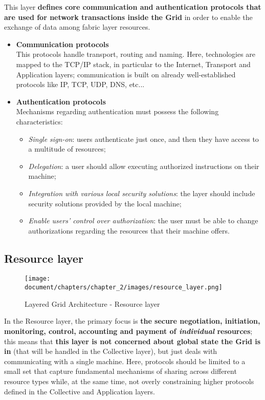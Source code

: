 \noindent This layer \textbf{defines core communication and authentication protocols that are used for network transactions inside the Grid} in order to enable the exchange of data among fabric layer resources.
\begin{itemize}
    \item \textbf{Communication protocols}\\
    This protocols handle transport, routing and naming. Here, technologies are mapped to the TCP/IP stack, in particular to the Internet, Transport and Application layers; communication is built on already well-established protocols like IP, TCP, UDP, DNS, etc... 
    \item \textbf{Authentication protocols}\\
    Mechanisms regarding authentication must possess the following characteristics:
    \begin{itemize}
        \item \textit{Single sign-on}: users authenticate just once, and then they have access to a multitude of resources;
        \item \textit{Delegation}: a user should allow executing authorized instructions on their machine; 
        \item \textit{Integration with various local security solutions}: the layer should include security solutions provided by the local machine;
        \item \textit{Enable users' control over authorization}: the user must be able to change authorizations regarding the resources that their machine offers.
    \end{itemize}
\end{itemize}

\subsection{Resource layer}
\begin{figure}[!ht]
    \centering
    \texttt{[image: document/chapters/chapter\_2/images/resource\_layer.png]}
    \caption{Layered Grid Architecture - Resource layer}
    \label{fig:resource_layer}
\end{figure}

\noindent In the Resource layer, the primary focus is \textbf{the secure negotiation, initiation, monitoring, control, accounting and payment of \textit{individual} resources}; this means that \textbf{this layer is not concerned about global state the Grid is in} (that will be handled in the Collective layer), but just deals with communicating with a single machine. Here, protocols should be limited to a small set that capture fundamental mechanisms of sharing across different resource types while, at the same time, not overly constraining higher protocols defined in the Collective and Application layers.

